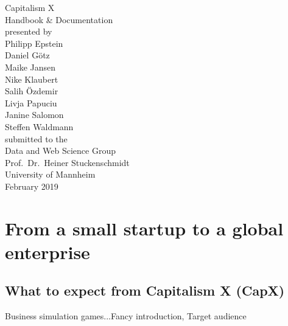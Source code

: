 \documentclass[11pt,titlepage,oneside,openany]{book}
\begin{document}
\begin{titlepage}
	\vspace*{2cm}
  \begin{center}
   {\Large Capitalism X\\}
   \vspace{2cm} 
   {Handbook \& Documentation\\}
   \vspace{2cm}
   {presented by\\
   Philipp Epstein \\
    Daniel G\"otz \\
Maike Jansen \\
Nike Klaubert \\
Salih \"Ozdemir \\
Livja Papuciu \\
Janine Salomon \\
Steffen Waldmann \\
   }
   \vspace{1cm} 
   {submitted to the\\
    Data and Web Science Group\\
    Prof.\ Dr.\ Heiner Stuckenschmidt\\
    University of Mannheim\\} \vspace{2cm}
   {February 2019}
  \end{center}
\end{titlepage} 

\tableofcontents
\newpage

\listoffigures

\listoftables


\newpage
\chapter{From a small startup to a global enterprise}
\label{cha:intro}
\section{What to expect from Capitalism X (CapX)}

Business simulation games...Fancy introduction, Target audience
\end{document}
